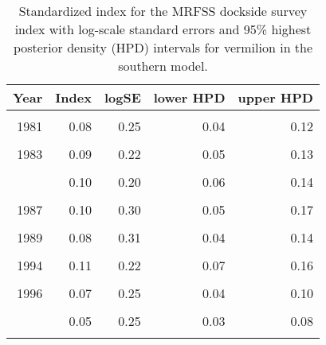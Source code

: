 \documentclass[
]{article}
\begin{document}
\begin{table}

\caption{\label{tab:tab-index-mrfss}Standardized index for the MRFSS dockside survey index with log-scale standard errors and 95\% highest
       posterior density (HPD) intervals for vermilion in the southern model.}
\centering
\begin{tabular}[t]{rrrrr}
\toprule
Year & Index & logSE & lower HPD & upper HPD\\
\midrule
\cellcolor{gray!6}{1980} & \cellcolor{gray!6}{0.03} & \cellcolor{gray!6}{0.30} & \cellcolor{gray!6}{0.02} & \cellcolor{gray!6}{0.05}\\
1981 & 0.08 & 0.25 & 0.04 & 0.12\\
\cellcolor{gray!6}{1982} & \cellcolor{gray!6}{0.06} & \cellcolor{gray!6}{0.25} & \cellcolor{gray!6}{0.03} & \cellcolor{gray!6}{0.09}\\
1983 & 0.09 & 0.22 & 0.05 & 0.13\\
\cellcolor{gray!6}{1984} & \cellcolor{gray!6}{0.12} & \cellcolor{gray!6}{0.17} & \cellcolor{gray!6}{0.08} & \cellcolor{gray!6}{0.16}\\
\addlinespace
1985 & 0.10 & 0.20 & 0.06 & 0.14\\
\cellcolor{gray!6}{1986} & \cellcolor{gray!6}{0.18} & \cellcolor{gray!6}{0.18} & \cellcolor{gray!6}{0.13} & \cellcolor{gray!6}{0.26}\\
1987 & 0.10 & 0.30 & 0.05 & 0.17\\
\cellcolor{gray!6}{1988} & \cellcolor{gray!6}{0.16} & \cellcolor{gray!6}{0.22} & \cellcolor{gray!6}{0.10} & \cellcolor{gray!6}{0.25}\\
1989 & 0.08 & 0.31 & 0.04 & 0.14\\
\addlinespace
\cellcolor{gray!6}{1993} & \cellcolor{gray!6}{0.06} & \cellcolor{gray!6}{0.28} & \cellcolor{gray!6}{0.03} & \cellcolor{gray!6}{0.10}\\
1994 & 0.11 & 0.22 & 0.07 & 0.16\\
\cellcolor{gray!6}{1995} & \cellcolor{gray!6}{0.04} & \cellcolor{gray!6}{0.42} & \cellcolor{gray!6}{0.02} & \cellcolor{gray!6}{0.09}\\
1996 & 0.07 & 0.25 & 0.04 & 0.10\\
\cellcolor{gray!6}{1997} & \cellcolor{gray!6}{0.04} & \cellcolor{gray!6}{0.46} & \cellcolor{gray!6}{0.02} & \cellcolor{gray!6}{0.09}\\
\addlinespace
1998 & 0.05 & 0.25 & 0.03 & 0.08\\
\cellcolor{gray!6}{1999} & \cellcolor{gray!6}{0.15} & \cellcolor{gray!6}{0.17} & \cellcolor{gray!6}{0.10} & \cellcolor{gray!6}{0.21}\\
\bottomrule
\end{tabular}
\end{table}
\end{document}
